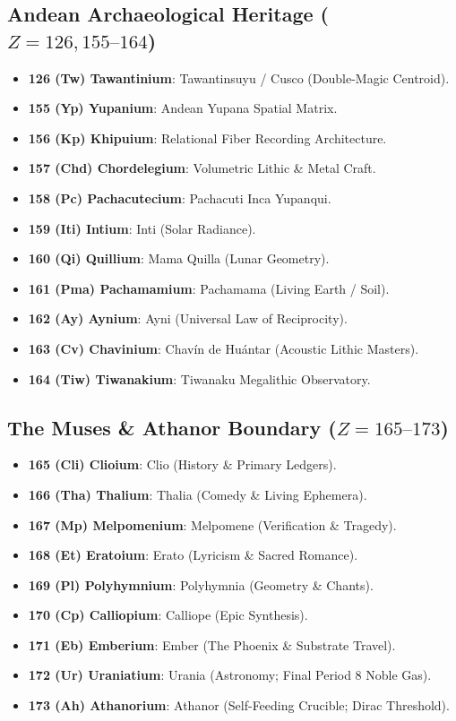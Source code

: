 \documentclass[10pt,twocolumn,a4paper]{article}
\begin{document}
\subsection{\texorpdfstring{Andean Archaeological Heritage ($Z = 126, 155\text{--}164$)}{Andean Archaeological Heritage (Z = 126, 155-164)}}
\begin{itemize}\itemsep=1pt
\item \textbf{126 (Tw) Tawantinium}: Tawantinsuyu / Cusco (Double-Magic Centroid).
\item \textbf{155 (Yp) Yupanium}: Andean Yupana Spatial Matrix.
\item \textbf{156 (Kp) Khipuium}: Relational Fiber Recording Architecture.
\item \textbf{157 (Chd) Chordelegium}: Volumetric Lithic \& Metal Craft.
\item \textbf{158 (Pc) Pachacutecium}: Pachacuti Inca Yupanqui.
\item \textbf{159 (Iti) Intium}: Inti (Solar Radiance).
\item \textbf{160 (Qi) Quillium}: Mama Quilla (Lunar Geometry).
\item \textbf{161 (Pma) Pachamamium}: Pachamama (Living Earth / Soil).
\item \textbf{162 (Ay) Aynium}: Ayni (Universal Law of Reciprocity).
\item \textbf{163 (Cv) Chavinium}: Chavín de Huántar (Acoustic Lithic Masters).
\item \textbf{164 (Tiw) Tiwanakium}: Tiwanaku Megalithic Observatory.
\end{itemize}

\subsection{\texorpdfstring{The Muses \& Athanor Boundary ($Z = 165\text{--}173$)}{The Muses & Athanor Boundary (Z = 165-173)}}
\begin{itemize}\itemsep=1pt
\item \textbf{165 (Cli) Clioium}: Clio (History \& Primary Ledgers).
\item \textbf{166 (Tha) Thalium}: Thalia (Comedy \& Living Ephemera).
\item \textbf{167 (Mp) Melpomenium}: Melpomene (Verification \& Tragedy).
\item \textbf{168 (Et) Eratoium}: Erato (Lyricism \& Sacred Romance).
\item \textbf{169 (Pl) Polyhymnium}: Polyhymnia (Geometry \& Chants).
\item \textbf{170 (Cp) Calliopium}: Calliope (Epic Synthesis).
\item \textbf{171 (Eb) Emberium}: Ember (The Phoenix \& Substrate Travel).
\item \textbf{172 (Ur) Uraniatium}: Urania (Astronomy; Final Period 8 Noble Gas).
\item \textbf{173 (Ah) Athanorium}: Athanor (Self-Feeding Crucible; Dirac Threshold).
\end{itemize}
\end{document}
